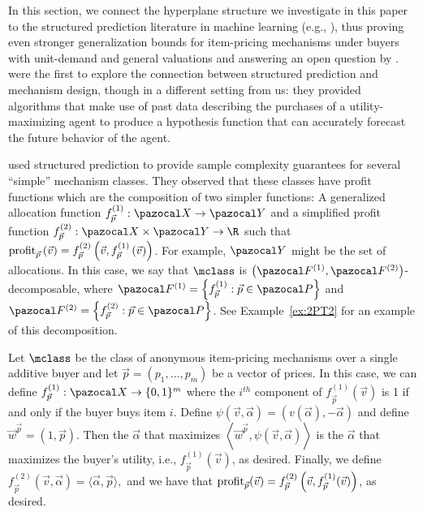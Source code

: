 In this section, we connect the hyperplane structure we investigate in this paper to the structured prediction literature in machine learning (e.g., \citep{Collins00:Discriminative}), thus proving even stronger generalization bounds for item-pricing mechanisms under buyers with unit-demand and general valuations and answering an open question by \citet{Morgenstern16:Learning}.
\citet{Balcan14:Learning} were the first to explore the connection between structured prediction and mechanism design, though in a different setting from us: they provided algorithms that make use of past data describing the purchases of a utility-maximizing agent to produce a hypothesis function that can accurately forecast the future behavior of the agent.

 \citet{Morgenstern16:Learning} used structured prediction to provide sample complexity guarantees for several ``simple'' mechanism classes. They observed that these classes have profit functions which are the composition of two simpler functions: A generalized allocation function $f^{\left(1\right)}_{\vec{p}} : \domain \to \range$ and a simplified profit function $f^{\left(2\right)}_{\vec{p}} : \domain \times \range \to \R$ such that $\textnormal{profit}_{\vec{p}}\left(\vec{v}\right) = f^{\left(2\right)}_{\vec{p}}\left(\vec{v}, f^{\left(1\right)}_{\vec{p}}\left(\vec{v}\right)\right)$. For example, $\range$ might be the set of allocations. In this case, we say that $\mclass$ is $\left(\fclass^{\left(1\right)}, \fclass^{\left(2\right)}\right)$-decomposable, where $\fclass^{\left(1\right)} = \left\{f^{\left(1\right)}_{\vec{p}} : \vec{p} \in \pspace\right\}$ and $\fclass^{\left(2\right)} = \left\{f^{\left(2\right)}_{\vec{p}} : \vec{p} \in \pspace\right\}$.
See Example~\ref{ex:2PT2} for an example of this decomposition.
\begin{example}\label{ex:2PT2}
Let $\mclass$ be the class of anonymous item-pricing mechanisms over a single additive buyer and let $\vec{p} = (p_1,\dots, p_m)$ be a vector of prices. In this case, we can define $f_{\vec{p}}^{(1)}: \domain \to \{0,1\}^m$ where the $i^{th}$ component of $f_{\vec{p}}^{(1)}(\vec{v})$ is 1 if and only if the buyer buys item $i$. Define $\psi(\vec{v}, \vec{\alpha}) = (v(\vec{\alpha}), -\vec{\alpha})$ and define $\vec{w}^{\vec{p}} = (1, \vec{p})$. Then the $\vec{\alpha}$ that maximizes $ \left\langle\vec{w}^{\vec{p}}, \psi(\vec{v}, \vec{\alpha})\right\rangle$ is the $\vec{\alpha}$ that maximizes the buyer's utility, i.e., $f^{(1)}_{\vec{p}}(\vec{v})$, as desired.
Finally, we define $f_{\vec{p}}^{(2)}(\vec{v}, \vec{\alpha}) =\langle \vec{\alpha}, \vec{p}\rangle,$  and we have that $\textnormal{profit}_{\vec{p}}(\vec{v}) = f_{\vec{p}}^{(2)}\left(\vec{v}, f_{\vec{p}}^{(1)}(\vec{v})\right)$, as desired.
\end{example}

